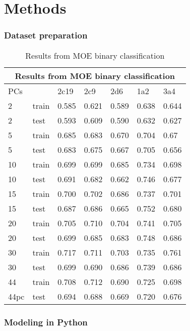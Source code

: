 \section{Methods}
\subsubsection{Dataset preparation}




\begin{table}[!htbp]
\begin{tabular}{|l|l|l|l|l|l|l|}
\hline
\multicolumn{7}{|c|}{Results from MOE binary classification}                        \\ \hline
PCs  &       & 2c19  & 2c9   & 2d6   & 1a2   & 3a4   \\ \hline
2    & train & 0.585 & 0.621 & 0.589 & 0.638 & 0.644 \\ \hline
2    & test  & 0.593 & 0.609 & 0.590 & 0.632 & 0.627 \\ \hline
5    & train & 0.685 & 0.683 & 0.670 & 0.704 & 0.67  \\ \hline
5    & test  & 0.683 & 0.675 & 0.667 & 0.705 & 0.656 \\ \hline
10   & train & 0.699 & 0.699 & 0.685 & 0.734 & 0.698 \\ \hline
10   & test  & 0.691 & 0.682 & 0.662 & 0.746 & 0.677 \\ \hline
15   & train & 0.700 & 0.702 & 0.686 & 0.737 & 0.701 \\ \hline
15   & test  & 0.687 & 0.686 & 0.665 & 0.752 & 0.680 \\ \hline
20   & train & 0.705 & 0.710 & 0.704 & 0.741 & 0.705 \\ \hline
20   & test  & 0.699 & 0.685 & 0.683 & 0.748 & 0.686 \\ \hline
30   & train & 0.717 & 0.711 & 0.703 & 0.735 & 0.761 \\ \hline
30   & test  & 0.699 & 0.690 & 0.686 & 0.739 & 0.686 \\ \hline
44   & train & 0.708 & 0.712 & 0.690 & 0.725 & 0.698 \\ \hline
44pc & test  & 0.694 & 0.688 & 0.669 & 0.720 & 0.676 \\ \hline
\end{tabular}
\caption{Results from MOE binary classification}
\end{table}

\subsubsection{Modeling in Python}

